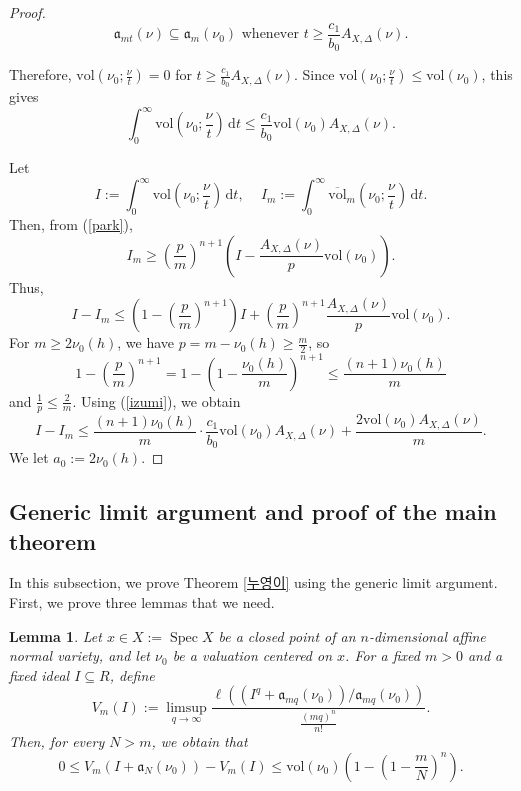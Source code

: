 \documentclass[a4paper,12pt]{amsart}
\newtheorem{lemma}[theorem]{Lemma}
\theoremstyle{definition} %
\theoremstyle{remark}
\numberwithin{equation}{section}
\def\Spec{\operatorname{Spec}}
\begin{document}
\begin{proof}
\begin{equation} \label{uchang}
\mathfrak{a}_{mt}(\nu)\subseteq \mathfrak{a}_m(\nu_0)\text{ whenever }t\ge \frac{c_1}{b_0}A_{X,\Delta}(\nu).
\end{equation}

Therefore, $\mathrm{vol}\left(\nu_0;\frac{\nu}{t}\right)=0$ for $t\ge \frac{c_1}{b_0}A_{X,\Delta}(\nu)$. Since $\mathrm{vol}\left(\nu_0;\frac{\nu}{t}\right)\le \mathrm{vol}(\nu_0)$, this gives
\begin{equation} \label{izumi}
\int^{\infty}_0 \mathrm{vol}\left(\nu_0;\frac{\nu}{t}\right)\,\mathrm{d} t\le \frac{c_1}{b_0}\mathrm{vol}(\nu_0)A_{X,\Delta}(\nu).
\end{equation}

\smallskip

Let
$$ I:=\int^{\infty}_{0} \mathrm{vol}\left(\nu_0;\frac{\nu}{t}\right)\,\mathrm{d} t,\,\,\,\,\,\,\, I_m:=\int^{\infty}_0\overline{\mathrm{vol}}_m\left(\nu_0;\frac{\nu}{t}\right)\,\mathrm{d}t. $$
Then, from (\ref{park}),
$$ I_m\ge \left(\frac{p}{m}\right)^{n+1}\left(I-\frac{A_{X,\Delta}(\nu)}{p}\mathrm{vol}(\nu_0)\right).$$
Thus,
$$ I-I_m\le \left(1-\left(\frac{p}{m}\right)^{n+1}\right)I+\left(\frac{p}{m}\right)^{n+1}\frac{A_{X,\Delta}(\nu)}{p}\mathrm{vol}(\nu_0).$$
For $m\ge 2\nu_0(h)$, we have $p=m-\nu_0(h)\ge \frac{m}{2}$, so
$$ 1-\left(\frac{p}{m}\right)^{n+1}=1-\left(1-\frac{\nu_0(h)}{m}\right)^{n+1}\le \frac{(n+1)\nu_0(h)}{m}$$
and $\frac{1}{p}\le \frac{2}{m}$. Using (\ref{izumi}), we obtain
$$ I-I_m\le \frac{(n+1)\nu_0(h)}{m}\cdot \frac{c_1}{b_0}\mathrm{vol}(\nu_0)A_{X,\Delta}(\nu)+\frac{2\mathrm{vol}(\nu_0)A_{X,\Delta}(\nu)}{m}.$$
We let $a_0:=2\nu_0(h)$.
\end{proof}

\subsection{Generic limit argument and proof of the main theorem}
In this subsection, we prove Theorem \ref{누영이} using the generic limit argument. First, we prove three lemmas that we need.

\begin{lemma} \label{듸듸<3}
Let $x\in X:=\Spec X$ be a closed point of an $n$-dimensional affine normal variety, and let $\nu_0$ be a valuation centered on $x$. For a fixed $m>0$ and a fixed ideal $I\subseteq R$, define
$$ V_m(I):=\limsup_{q\to \infty}\frac{\ell((I^q+\mathfrak{a}_{mq}(\nu_0))/\mathfrak{a}_{mq}(\nu_0))}{\frac{(mq)^n}{n!}}.$$
Then, for every $N>m$, we obtain that
$$ 0\le V_m(I+\mathfrak{a}_{N}(\nu_0))-V_m(I)\le \mathrm{vol}(\nu_0)\left(1-\left(1-\frac{m}{N}\right)^n\right).$$
\end{lemma}
\end{document}
